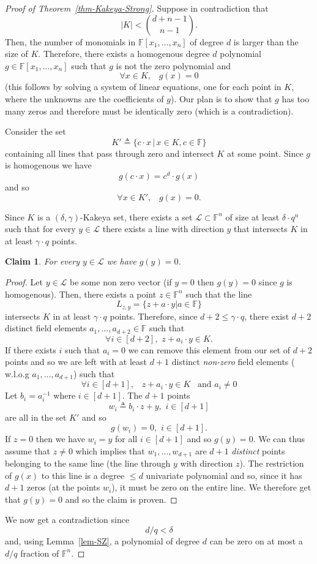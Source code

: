 \documentclass[12pt]{article}
\newtheorem{claim}[thm]{Claim}
\def\F{{\mathbb{F}}}
\def\cL{{\mathcal L}}
\def\_{\,\,\,\,\,}
\begin{document}
\begin{proof}[Proof of Theorem~\ref{thm-Kakeya-Strong}]
Suppose in contradiction that $$|K| < { d + n-1 \choose n-1 }.$$
Then, the number of monomials in $\F[x_1,\ldots,x_n]$ of degree
$d$ is larger than the size of $K$. Therefore, there exists a
homogenous degree $d$ polynomial $g \in \F[x_1,\ldots,x_n]$ such
that $g$ is not the zero polynomial and
\[ \forall x \in K, \_ g(x)=0 \]
(this follows by solving a system of linear equations, one for
each point in $K$, where the unknowns are the coefficients of
$g$). Our plan is to show that $g$ has too many zeros and
therefore must be identically zero (which is a contradiction).

Consider the set
\[ K' \triangleq \{ c \cdot x \, | \, x \in K, c \in \F \} \]
containing all lines that pass through zero and intersect $K$ at
some point. Since $g$ is homogenous we have $$g(c \cdot x) = c^d
\cdot g(x)$$ and so
\[ \forall x \in K', \_ g(x)=0. \]

Since $K$ is a $(\delta,\gamma)$-Kakeya set, there exists a set
$\cL \subset \F^n$ of size at least $\delta \cdot q^n$ such that
for every $y \in \cL$ there exists a line with direction $y$ that
intersects $K$ in at least $\gamma \cdot q$ points.

\begin{claim}
For every $y \in \cL$ we have $g(y)=0$.
\end{claim}
\begin{proof}
Let $y \in \cL$ be some non zero vector (if $y=0$ then $g(y)=0$
since $g$ is homogenous). Then, there exists a point $z \in \F^n$
such that the line
\[ L_{z,y} = \{ z + a \cdot y | a \in \F \} \]
intersects $K$ in at least $\gamma \cdot q$ points. Therefore,
since $d+2 \leq \gamma \cdot q$, there exist $d+2$ distinct field
elements $a_1,\ldots,a_{d+2} \in \F$ such that $$\forall i \in
[d+2], \,\, z + a_i \cdot y \in K.$$ If there exists $i$ such that
$a_i=0$ we can remove this element from our set of $d+2$ points
and so we are left with at least $d+1$ distinct {\em non-zero}
field elements ( w.l.o.g $a_1,\ldots,a_{d+1}$) such that
\[\forall i \in
[d+1], \_ z + a_i \cdot y \in K \_ \text{and} \,\, a_i \neq 0\]
Let $b_i = a_i^{-1}$ where $i \in [d+1]$. The $d+1$ points
\[ w_i \triangleq b_i \cdot z + y , \,\, i \in [d+1] \]
are all in the set $K'$ and so
\[ g(w_i) = 0 , \,\, i \in [d+1]. \]
If $z=0$ then we have $w_i = y$ for all $i \in [d+1]$ and so
$g(y)=0$. We can thus assume that $z \neq 0$ which implies that
$w_1,\ldots,w_{d+1}$ are $d+1$ {\em distinct} points belonging to
the same line (the line through $y$ with direction $z$). The
restriction of $g(x)$ to this line is a degree $\leq d$ univariate
polynomial and so, since it has $d+1$ zeros (at the points $w_i$),
it must be zero on the entire line. We therefore get that $g(y)=0$
and so the claim is proven.
\end{proof}

We now get a contradiction since $$d/q < \delta$$ and, using
Lemma~\ref{lem-SZ}, a polynomial of degree $d$ can be zero on at
most a $d/q$ fraction of $\F^n$.
\end{proof}
\end{document}
